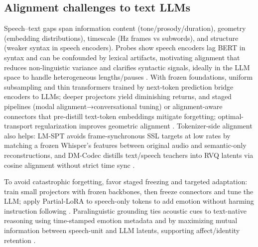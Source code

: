 \documentclass{article}
\begin{document}
\subsection{Alignment challenges to text LLMs} \label{subsec:Alignment challenges to text LLMs}
Speech–text gaps span information content (tone/prosody/duration), geometry (embedding distributions), timescale (Hz frames vs subwords), and structure (weaker syntax in speech encoders). Probes show speech encoders lag BERT in syntax and can be confounded by lexical artifacts, motivating alignment that reduces non-linguistic variance and clarifies syntactic signals, ideally in the LLM space to handle heterogeneous lengths/pauses \cite{shen2023wavesyntaxprobingspokenlanguagemodels,xu2025optimaltransportregularizationspeechtext}. With frozen foundations, uniform subsampling and thin transformers trained by next-token prediction bridge encoders to LLMs; deeper projectors yield diminishing returns, and staged pipelines (modal alignment→conversational tuning) or alignment-aware connectors that pre-distill text-token embeddings mitigate forgetting; optimal-transport regularization improves geometric alignment \cite{wang2023slmbridgethingapbetweenspeechtextfoundat,shu2023llasmlargelanguagespeechmodel,tan2025ssralignmentawaremodalityconnectorspeech,xu2025optimaltransportregularizationspeechtext}. Tokenizer-side alignment also helps: LM-SPT avoids frame-synchronous SSL targets at low rates by matching a frozen Whisper’s features between original audio and semantic-only reconstructions, and DM-Codec distills text/speech teachers into RVQ latents via cosine alignment without strict time sync \cite{jo2025lmsptalignedsemanticdistillationspeechto,ahasan2025dmcodecdistillingmultimodalrepresentatio}.

To avoid catastrophic forgetting, favor staged freezing and targeted adaptation: train small projectors with frozen backbones, then freeze connectors and tune the LLM; apply Partial-LoRA to speech-only tokens to add emotion without harming instruction following \cite{wang2023slmbridgethingapbetweenspeechtextfoundat,tan2025ssralignmentawaremodalityconnectorspeech,wang2024blspemotowardsempatheticlargespeechlangu}. Paralinguistic grounding ties acoustic cues to text-native reasoning using time-stamped emotion metadata and by maximizing mutual information between speech-unit and LLM latents, supporting affect/identity retention \cite{wang2025incorporatingcontextualparalinguisticund,wang2025bossbeyondsemanticspeech}.
\end{document}
